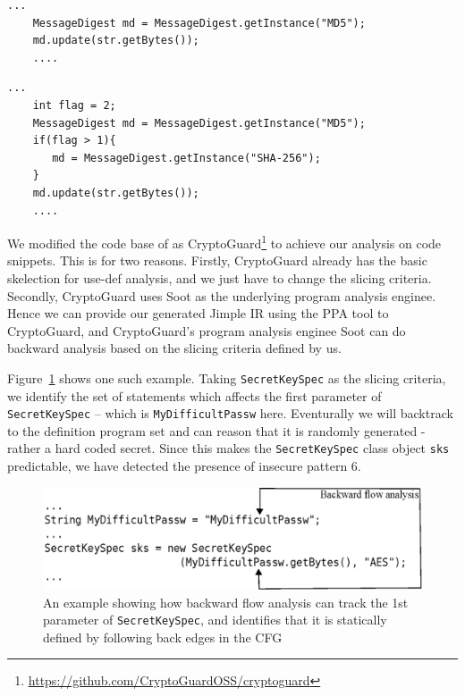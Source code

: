 \begin{lstlisting}[caption={A code snippet where keyword based detection work well}, label={fig:aes-without-vars}]
    ...
    MessageDigest md = MessageDigest.getInstance("MD5");
    md.update(str.getBytes());
    ....
\end{lstlisting}

\begin{lstlisting}[caption={A code snippet where keyword based detection introduces FP}, label={fig:aes-with-vars}]
    ...
    int flag = 2;
    MessageDigest md = MessageDigest.getInstance("MD5");
    if(flag > 1){
       md = MessageDigest.getInstance("SHA-256");
    }
    md.update(str.getBytes());
    ....
\end{lstlisting}


We modified the code base of  as CryptoGuard\footnote{\url{https://github.com/CryptoGuardOSS/cryptoguard}} to achieve our analysis on code snippets. 
This is for two reasons. Firstly, CryptoGuard already has the basic skelection for use-def analysis, and we just have to change the slicing criteria. 
Secondly, CryptoGuard uses Soot as the underlying program analysis enginee. 
Hence we can provide our generated Jimple IR using the PPA tool to CryptoGuard, and   
CryptoGuard's program analysis enginee Soot can do backward analysis based on the slicing criteria defined by us.

Figure~\ref{fig:slicing} shows one such example. Taking \texttt{SecretKeySpec} as the slicing criteria, 
we identify the set of statements which affects the first parameter of \texttt{SecretKeySpec} -- 
which is \texttt{MyDifficultPassw} here. Eventurally we will backtrack to the definition program set and can reason 
that it is randomly generated - rather a hard coded  secret. Since this makes the \texttt{SecretKeySpec} class object \texttt{sks} predictable,
 we have detected the presence of insecure pattern 6.

\begin{figure}[ht]
\includegraphics[width=\linewidth]{Figures/bckfwanalysis.eps}
\caption{An example showing how backward flow analysis can track 
the 1st parameter of \texttt{SecretKeySpec}, 
and identifies that it is statically defined by following back edges in the CFG}
\label{fig:slicing}
\end{figure}

